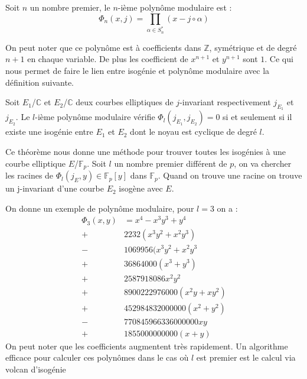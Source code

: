 \documentclass[12pt]{article}
\begin{document}
\begin{defi}
Soit $n$ un nombre premier, le $n$-ième polynôme modulaire est :
\begin{equation*}
\Phi_n(x,j) = \prod_{\alpha \in S_n^*} (x - j \circ \alpha)
\end{equation*}
\end{defi}
On peut noter que ce polynôme est à coefficients dans $\mathbb{Z}$, symétrique et de degré $n+1$ en chaque variable. De plus les coefficient de $x^{n+1}$ et $y^{n+1}$ sont $1$.
Ce qui nous permet de faire le lien entre isogénie et polynôme modulaire avec la définition suivante.
\begin{defi}
Soit $E_1$/$\mathbb{C}$ et $E_2$/$\mathbb{C}$ deux courbes elliptiques de $j$-invariant respectivement $j_{E_1}$ et $j_{E_2}$. Le $l$-ième polynôme modulaire vérifie $\Phi_l(j_{E_1},j_{E_2}) = 0$ si et seulement si il existe une isogénie entre $E_1$ et $E_2$ dont le noyau est cyclique de degré $l$.
\end{defi}

Ce théorème nous donne une méthode pour trouver toutes les isogénies à une courbe elliptique $E$/$\mathbb{F}_p$. Soit $l$ un nombre premier différent de $p$, on va chercher les racines de $\Phi_l(j_E, y) \in \mathbb{F}_p[y]$ dans $\mathbb{F}_p$. Quand on trouve une racine on trouve un j-invariant d'une courbe $E_2$ isogène avec $E$. 

On donne un exemple de polynôme modulaire, pour $ l =3$ on a :
\begin{align*}
\Phi_3(x,y) &= x^4 -x^3y^3 + y^4 \\
 +& 2232(x^3y^2 + x^2y^3) \\
 -& 1069956(x^3y^2 + x^2y^3 \\
 +& 36864000(x^3 + y^3) \\
 +& 2587918086x^2y^2 \\
 +& 8900222976000(x^2y + xy^2) \\
 +& 452984832000000(x^2 + y^2) \\
 -& 770845966336000000xy \\
 +& 1855000000000(x+y) 
\end{align*}
On peut noter que les coefficients augmentent très rapidement. Un algorithme efficace pour calculer ces polynômes dans le cas où $l$ est premier est le calcul via volcan d'isogénie \cite{volcan}
\end{document}

